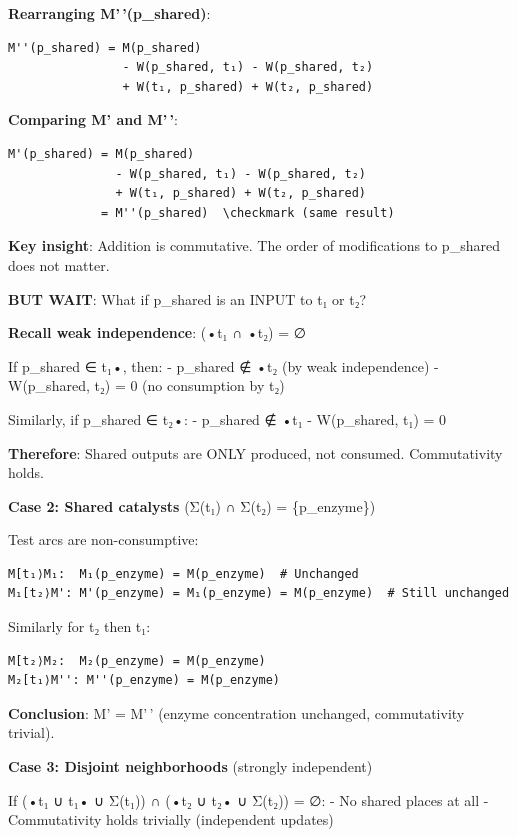 \textbf{Rearranging M'\,'(p\_shared)}:

\begin{lstlisting}
M''(p_shared) = M(p_shared) 
                - W(p_shared, t₁) - W(p_shared, t₂)
                + W(t₁, p_shared) + W(t₂, p_shared)
\end{lstlisting}

\textbf{Comparing M' and M'\,'}:

\begin{lstlisting}
M'(p_shared) = M(p_shared) 
               - W(p_shared, t₁) - W(p_shared, t₂)
               + W(t₁, p_shared) + W(t₂, p_shared)
             = M''(p_shared)  \checkmark (same result)
\end{lstlisting}

\textbf{Key insight}: Addition is commutative. The order of
modifications to p\_shared does not matter.

\textbf{BUT WAIT}: What if p\_shared is an INPUT to t₁ or t₂?

\textbf{Recall weak independence}: (•t₁ ∩ •t₂) = ∅

If p\_shared ∈ t₁•, then: - p\_shared ∉ •t₂ (by weak independence) -
W(p\_shared, t₂) = 0 (no consumption by t₂)

Similarly, if p\_shared ∈ t₂•: - p\_shared ∉ •t₁ - W(p\_shared, t₁) = 0

\textbf{Therefore}: Shared outputs are ONLY produced, not consumed.
Commutativity holds.

\textbf{Case 2: Shared catalysts} (Σ(t₁) ∩ Σ(t₂) = \{p\_enzyme\})

Test arcs are non-consumptive:

\begin{lstlisting}
M[t₁⟩M₁:  M₁(p_enzyme) = M(p_enzyme)  # Unchanged
M₁[t₂⟩M': M'(p_enzyme) = M₁(p_enzyme) = M(p_enzyme)  # Still unchanged
\end{lstlisting}

Similarly for t₂ then t₁:

\begin{lstlisting}
M[t₂⟩M₂:  M₂(p_enzyme) = M(p_enzyme)
M₂[t₁⟩M'': M''(p_enzyme) = M(p_enzyme)
\end{lstlisting}

\textbf{Conclusion}: M' = M'\,' (enzyme concentration unchanged,
commutativity trivial).

\textbf{Case 3: Disjoint neighborhoods} (strongly independent)

If (•t₁ ∪ t₁• ∪ Σ(t₁)) ∩ (•t₂ ∪ t₂• ∪ Σ(t₂)) = ∅: - No shared places at
all - Commutativity holds trivially (independent updates)

